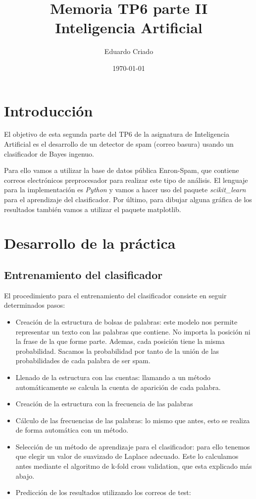 \documentclass[12pt]{article}
\begin{document}
\title{Memoria TP6 parte II \\ Inteligencia Artificial}
\author{
        Eduardo Criado}
\date{\today}

\maketitle

\section{Introducci\'on}
El objetivo de esta segunda parte del TP6 de la asignatura de Inteligencia
Artificial es el desarrollo de un detector de spam (correo basura) usando
un clasificador de Bayes ingenuo.

Para ello vamos a utilizar la base de datos p\'ublica Enron-Spam, que contiene
correos electr\'onicos preprocesador para realizar este tipo de an\'alisis.
El lenguaje para la implementaci\'on es \textit{Python} y vamos a hacer uso del
paquete \textit{scikit\_learn} para el aprendizaje del clasificador.
Por \'ultimo, para dibujar alguna gr\'afica de los resultados tambi\'en vamos
a utilizar el paquete matplotlib.

\section{Desarrollo de la pr\'actica}

\subsection{Entrenamiento del clasificador}
El procedimiento para el entrenamiento del clasificador consiste en seguir
determinados pasos:
\begin{itemize}
	\item Creaci\'on de la estructura de bolsas de palabras: este modelo nos
	permite representar un texto con las palabras que contiene. No importa
	la posici\'on ni la frase de la que forme parte. Ademas, cada posici\'on
	tiene la misma probabilidad. Sacamos la probabilidad por tanto de la
	uni\'on de las probabilidades de cada palabra de ser spam.

	\item Llenado de la estructura con las cuentas: llamando a un m\'etodo
	autom\'aticamente se calcula la cuenta de aparici\'on de cada palabra.

	\item Creaci\'on de la estructura con la frecuencia de las palabras
	\item C\'alculo de las frecuencias de las palabras: lo mismo que antes,
	esto se realiza de forma autom\'atica con un m\'etodo.
	\item Selecci\'on de un m\'etodo de aprendizaje para el clasificador:
	para ello tenemos que elegir un valor de suavizado de Laplace adecuado.
	Este lo calculamos antes mediante el algoritmo de k-fold cross
	validation, que esta explicado m\'as abajo.
	\item Predicci\'on de los resultados utilizando los correos de test:
\end{itemize}
\end{document}
